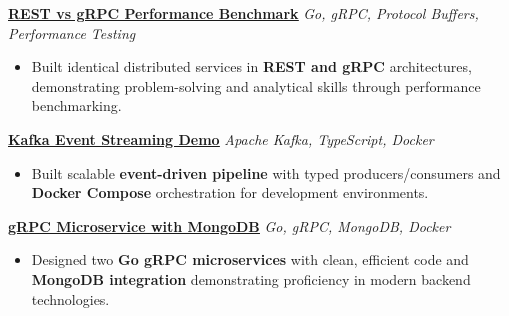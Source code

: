 \documentclass[a4paper,10pt]{article}
\begin{document}
\textbf{\href{https://github.com/Arjunsinh10/rest-vs-grpc-benchmark}{\uline{REST vs gRPC Performance Benchmark}}} \hfill \textit{Go, gRPC, Protocol Buffers, Performance Testing} \\
\vspace{-1.6em}
\begin{itemize}[itemsep=3pt, parsep=0pt, topsep=4pt, partopsep=0pt, leftmargin=1.2em]
  \item Built identical distributed services in \textbf{REST and gRPC} architectures, demonstrating problem-solving and analytical skills through performance benchmarking.
\end{itemize}

\textbf{\href{https://github.com/Arjunsinh10/kafka-event-streaming-demo}{\uline{Kafka Event Streaming Demo}}} \hfill \textit{Apache Kafka, TypeScript, Docker} \\
\vspace{-1.6em}
\begin{itemize}[itemsep=3pt, parsep=4pt, topsep=4pt, partopsep=0pt, leftmargin=1.2em]
  \item Built scalable \textbf{event-driven pipeline} with typed producers/consumers and \textbf{Docker Compose} orchestration for development environments.
\end{itemize}

\textbf{\href{https://github.com/Arjunsinh10/grpc-mongo-proto}{\uline{gRPC Microservice with MongoDB}}} \hfill \textit{Go, gRPC, MongoDB, Docker} \\
\vspace{-1.6em}
\begin{itemize}[itemsep=3pt, parsep=0pt, topsep=4pt, partopsep=0pt, leftmargin=1.2em]
  \item Designed two \textbf{Go gRPC microservices} with clean, efficient code and \textbf{MongoDB integration} demonstrating proficiency in modern backend technologies.
\end{itemize}

\vspace{-0.4em}

\end{document}
